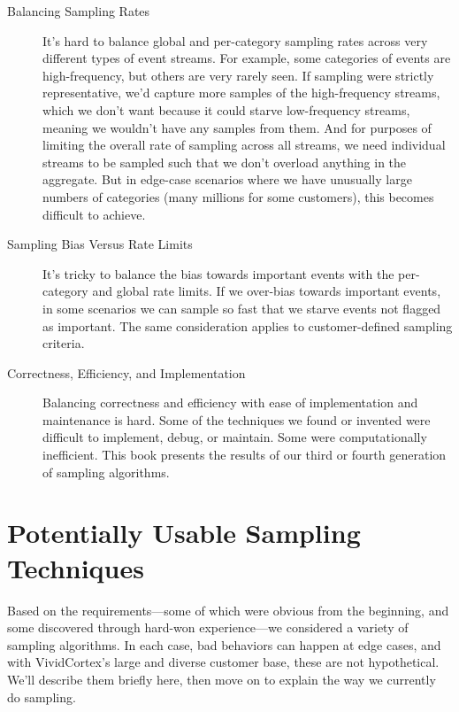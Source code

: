 \documentclass{vivid_layout}
\begin{document}
\begin{description}

\item[Balancing Sampling Rates] It's hard to balance global and per-category
sampling rates across very different types of event streams.  For example, some
categories of events are high-frequency, but others are very rarely seen. If
sampling were strictly representative, we'd capture more samples of the
high-frequency streams, which we don't want because it could starve
low-frequency streams, meaning we wouldn't have any samples from them. And for
purposes of limiting the overall rate of sampling across all streams, we need
individual streams to be sampled such that we don't overload anything in the
aggregate. But in edge-case scenarios where we have unusually large numbers of
categories (many millions for some customers), this becomes difficult to
achieve.

\item[Sampling Bias Versus Rate Limits] It's tricky to balance the bias towards
important events with the per-category and global rate limits. If we over-bias
towards important events, in some scenarios we can sample so fast that we starve
events not flagged as important. The same consideration applies to
customer-defined sampling criteria.

\item[Correctness, Efficiency, and Implementation] Balancing correctness and
efficiency with ease of implementation and maintenance is hard. Some of the
techniques we found or invented were difficult to implement, debug, or maintain.
Some were computationally inefficient. This book presents the results of our
third or fourth generation of sampling algorithms.

\end{description}

\section{Potentially Usable Sampling Techniques}

Based on the requirements---some of which were obvious from the beginning, and
some discovered through hard-won experience---we considered a variety of
sampling algorithms. In each case, bad behaviors can happen at edge cases, and
with VividCortex's large and diverse customer base, these are not hypothetical.
We'll describe them briefly here, then move on to explain the way we currently
do sampling.
\end{document}
